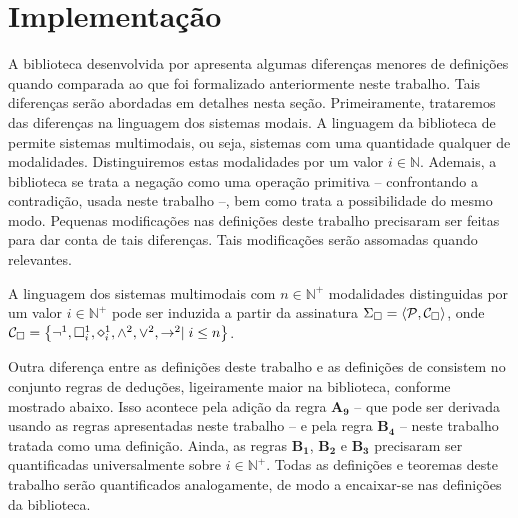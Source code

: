 \chapter{Implementação} 

A biblioteca desenvolvida por \cite{Silveira} apresenta algumas diferenças menores de definições quando comparada ao que foi formalizado anteriormente neste trabalho.
Tais diferenças serão abordadas em detalhes nesta seção.
Primeiramente, trataremos das diferenças na linguagem dos sistemas modais.
A linguagem da biblioteca de \cite{Silveira} permite sistemas multimodais, ou seja, sistemas com uma quantidade qualquer de modalidades.
Distinguiremos estas modalidades por um valor $i\in\mathbb{N}$.
Ademais, a biblioteca se \cite{Silveira} trata a negação como uma operação primitiva -- confrontando a contradição, usada neste trabalho --, bem como trata a possibilidade do mesmo modo.
Pequenas modificações nas definições deste trabalho precisaram ser feitas para dar conta de tais diferenças.
Tais modificações serão assomadas quando relevantes.

\begin{definition}
    A linguagem dos sistemas multimodais com $n\in\mathbb{N}^+$ modalidades distinguidas por um valor $i\in\mathbb{N}^+$ pode ser induzida a partir da assinatura $\Sigma_{\Box}=\langle\mathcal{P},\mathcal{C}_{\Box}\rangle$, onde $\mathcal{C}_{\nec}=\set{\neg^1,\nec^1_i,\pos^1_i,\wedge^2,\vee^2,\to^2\mid i\leq n}$.
\end{definition}

Outra diferença entre as definições deste trabalho e as definições de \cite{Silveira} consistem no conjunto regras de deduções, ligeiramente maior na biblioteca, conforme mostrado abaixo.
Isso acontece pela adição da regra $\mathbf{A_9}$ -- que pode ser derivada usando as regras apresentadas neste trabalho -- e pela regra $\mathbf{B_4}$ -- neste trabalho tratada como uma definição.
Ainda, as regras $\mathbf{B_1}$, $\mathbf{B_2}$ e $\mathbf{B_3}$ precisaram ser quantificadas universalmente sobre $i\in\mathbb{N}^+$.
Todas as definições e teoremas deste trabalho serão quantificados analogamente, de modo a encaixar-se nas definições da biblioteca.

